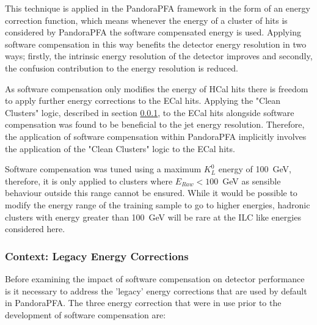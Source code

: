 This technique is applied in the PandoraPFA framework in the form of an energy correction function, which means whenever the energy of a cluster of hits is considered by PandoraPFA the software compensated energy is used.  Applying software compensation in this way benefits the detector energy resolution in two ways; firstly, the intrinsic energy resolution of the detector improves and secondly, the confusion contribution to the energy resolution is reduced.

As software compensation only modifies the energy of HCal hits there is freedom to apply further energy corrections to the ECal hits.  Applying the "Clean Clusters" logic, described in section \ref{sec:legacycorrections}, to the ECal hits alongside software compensation was found to be beneficial to the jet energy resolution.  Therefore, the application of software compensation within PandoraPFA implicitly involves the application of the "Clean Clusters" logic to the ECal hits.  

Software compensation was tuned using a maximum $K^{0}_{L}$ energy of 100~GeV, therefore, it is only applied to clusters where $E_{Raw} < 100$~GeV as sensible behaviour outside this range cannot be ensured.  While it would be possible to modify the energy range of the training sample to go to higher energies, hadronic clusters with energy greater than 100~GeV will be rare at the ILC like energies considered here.


\subsubsection{Context: Legacy Energy Corrections}
\label{sec:legacycorrections}
Before examining the impact of software compensation on detector performance is it necessary to address the 'legacy' energy corrections that are used by default in PandoraPFA.  The three energy correction that were in use prior to the development of software compensation are:


